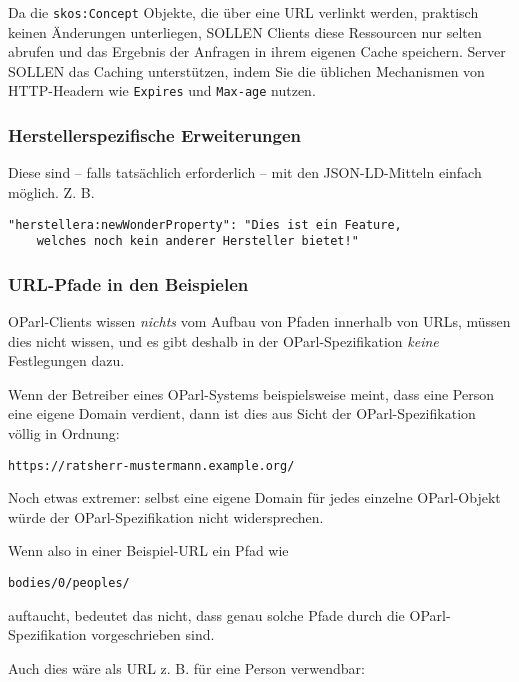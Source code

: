 \documentclass[,a4paper]{article}
\begin{document}
Da die \texttt{skos:Concept} Objekte, die über eine URL verlinkt werden,
praktisch keinen Änderungen unterliegen, SOLLEN Clients diese Ressourcen
nur selten abrufen und das Ergebnis der Anfragen in ihrem eigenen Cache
speichern. Server SOLLEN das Caching unterstützen, indem Sie die
üblichen Mechanismen von HTTP-Headern wie \texttt{Expires} und
\texttt{Max-age} nutzen.

\subsubsection{Herstellerspezifische
Erweiterungen}\label{herstellerspezifische-erweiterungen}

Diese sind -- falls tatsächlich erforderlich -- mit den JSON-LD-Mitteln
einfach möglich. Z. B.

\begin{verbatim}
"herstellera:newWonderProperty": "Dies ist ein Feature,
    welches noch kein anderer Hersteller bietet!"
\end{verbatim}

\subsubsection{URL-Pfade in den
Beispielen}\label{url-pfade-in-den-beispielen}

OParl-Clients wissen \emph{nichts} vom Aufbau von Pfaden innerhalb von
URLs, müssen dies nicht wissen, und es gibt deshalb in der
OParl-Spezifikation \emph{keine} Festlegungen dazu.

Wenn der Betreiber eines OParl-Systems beispielsweise meint, dass eine
Person eine eigene Domain verdient, dann ist dies aus Sicht der
OParl-Spezifikation völlig in Ordnung:

\begin{verbatim}
https://ratsherr-mustermann.example.org/
\end{verbatim}

Noch etwas extremer: selbst eine eigene Domain für jedes einzelne
OParl-Objekt würde der OParl-Spezifikation nicht widersprechen.

Wenn also in einer Beispiel-URL ein Pfad wie

\begin{verbatim}
bodies/0/peoples/
\end{verbatim}

auftaucht, bedeutet das nicht, dass genau solche Pfade durch die
OParl-Spezifikation vorgeschrieben sind.

Auch dies wäre als URL z. B. für eine Person verwendbar:
\end{document}
